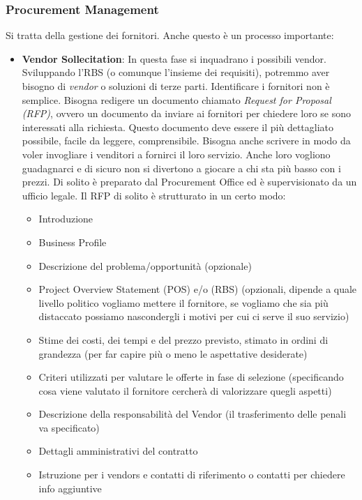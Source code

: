 \subsubsection{Procurement Management}
Si tratta della gestione dei fornitori. Anche questo è un processo importante:
\begin{itemize}
	\item \textbf{Vendor Sollecitation}: In questa fase si inquadrano i possibili vendor. Sviluppando l'RBS (o comunque l'insieme dei requisiti), potremmo aver bisogno di \textit{vendor} o soluzioni di terze parti. Identificare i fornitori non è semplice. Bisogna redigere un documento chiamato \textit{Request for Proposal (RFP)}, ovvero un documento da inviare ai fornitori per chiedere loro se sono interessati alla richiesta. Questo documento deve essere il più dettagliato possibile, facile da leggere, comprensibile. Bisogna anche scrivere in modo da voler invogliare i venditori a fornirci il loro servizio. Anche loro vogliono guadagnarci e di sicuro non si divertono a giocare a chi sta più basso con i prezzi. Di solito è preparato dal Procurement Office ed è supervisionato da un ufficio legale. Il RFP di solito è strutturato in un certo modo:
	\begin{itemize}
		\item Introduzione
		\item Business Profile
		\item Descrizione del problema/opportunità (opzionale)
		\item Project Overview Statement (POS) e/o (RBS) (opzionali, dipende a quale livello politico vogliamo mettere il fornitore, se vogliamo che sia più distaccato possiamo nascondergli i motivi per cui ci serve il suo servizio)
		\item Stime dei costi, dei tempi e del prezzo previsto, stimato in ordini di grandezza (per far capire più o meno le aspettative desiderate)
		\item Criteri utilizzati per valutare le offerte in fase di selezione (specificando cosa viene valutato il fornitore cercherà di valorizzare quegli aspetti)
		\item Descrizione della responsabilità del Vendor (il trasferimento delle penali va specificato)
		\item Dettagli amministrativi del contratto
		\item Istruzione per i vendors e contatti di riferimento o contatti per chiedere info aggiuntive

\end{itemize}
\end{itemize}
